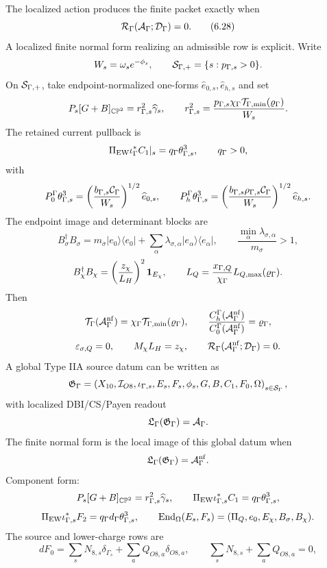 \documentclass[11pt]{article}
\theoremstyle{definition}
\theoremstyle{remark}
\newcommand{\CP}{\mathbb{CP}}
\begin{document}
The localized action produces the finite packet exactly when
\[
  {\cal R}_\Gamma({\cal A}_\Gamma;{\cal D}_\Gamma)=0 .
  \tag{6.28}
\]
A localized finite normal form realizing an admissible row is explicit.  Write
\[
  W_s=\omega_s e^{-\phi_s},
  \qquad
  {\cal S}_{\Gamma,+}=\{s:p_{\Gamma,s}>0\}.
\]
On \({\cal S}_{\Gamma,+}\), take endpoint-normalized one-forms
\(\widehat e_{0,s},\widehat e_{h,s}\) and set
\[
  P_s[G+B]_{\CP^2}
  =
  r_{\Gamma,s}^2\widehat\gamma_s,
  \qquad
  r_{\Gamma,s}^2
  =
  \frac{p_{\Gamma,s}\chi_\Gamma
  {\cal T}_{\Gamma,\min}(\varrho_\Gamma)}
  {W_s}.
\]
The retained current pullback is
\[
  \Pi_{\rm EW}\iota_\Gamma^*C_1|_s
  =
  q_\Gamma\theta_{\Gamma,s}^3,
  \qquad q_\Gamma>0,
\]
with
\[
  P_0^\Gamma\theta_{\Gamma,s}^3
  =
  \left(\frac{b_{\Gamma,s}{\cal C}_\Gamma}{W_s}\right)^{1/2}
  \widehat e_{0,s},
  \qquad
  P_h^\Gamma\theta_{\Gamma,s}^3
  =
  \left(\frac{b_{\Gamma,s}\rho_{\Gamma,s}{\cal C}_\Gamma}{W_s}\right)^{1/2}
  \widehat e_{h,s}.
\]
The endpoint image and determinant blocks are
\[
  B_\sigma^\dagger B_\sigma
  =
  m_\sigma |e_0\rangle\langle e_0|
  +
  \sum_\alpha
  \lambda_{\sigma,\alpha}|e_\alpha\rangle\langle e_\alpha|,
  \qquad
  \frac{\min_\alpha\lambda_{\sigma,\alpha}}{m_\sigma}>1,
\]
\[
  B_\chi^\dagger B_\chi
  =
  \left(\frac{z_\chi}{L_H}\right)^2{\bf 1}_{E_\chi},
  \qquad
  L_Q
  =
  \frac{x_{\Gamma,Q}}{\chi_\Gamma}L_{Q,\max}(\varrho_\Gamma).
\]
Then
\[
  {\cal T}_\Gamma({\cal A}_\Gamma^{\rm nf})
  =
  \chi_\Gamma{\cal T}_{\Gamma,\min}(\varrho_\Gamma),
  \qquad
  \frac{C_h^\Gamma({\cal A}_\Gamma^{\rm nf})}
  {C_0^\Gamma({\cal A}_\Gamma^{\rm nf})}
  =
  \varrho_\Gamma,
\]
\[
  \varepsilon_{\sigma,Q}=0,
  \qquad
  M_\chi L_H=z_\chi,
  \qquad
  {\cal R}_\Gamma({\cal A}_\Gamma^{\rm nf};{\cal D}_\Gamma)=0 .
\]
A global Type IIA source datum can be written as
\[
  {\mathfrak G}_\Gamma
  =
  \left(
  X_{10},{\cal I}_{O8},
  \iota_{\Gamma,s},E_s,F_s,\phi_s,G,B,C_1,F_0,\Omega
  \right)_{s\in{\cal S}_\Gamma},
\]
with localized DBI/CS/Payen readout
\[
  {\mathfrak L}_\Gamma({\mathfrak G}_\Gamma)={\cal A}_\Gamma .
\]
The finite normal form is the local image of this global datum when
\[
  {\mathfrak L}_\Gamma({\mathfrak G}_\Gamma)={\cal A}_\Gamma^{\rm nf}.
\]
Component form:
\[
  P_s[G+B]_{\CP^2}=r_{\Gamma,s}^2\widehat\gamma_s,
  \qquad
  \Pi_{\rm EW}\iota_{\Gamma,s}^*C_1=q_\Gamma\theta_{\Gamma,s}^3,
\]
\[
  \Pi_{\rm EW}\iota_{\Gamma,s}^*F_2
  =
  q_\Gamma d_\Gamma\theta_{\Gamma,s}^3,
  \qquad
  {\rm End}_\Omega(E_s,F_s)
  =
  (\Pi_Q,e_0,E_\chi,B_\sigma,B_\chi).
\]
The source and lower-charge rows are
\[
  dF_0
  =
  \sum_sN_{8,s}\delta_{\Gamma_s}
  +
  \sum_aQ_{O8,a}\delta_{O8,a},
  \qquad
  \sum_sN_{8,s}+\sum_aQ_{O8,a}=0,
\]
\end{document}
